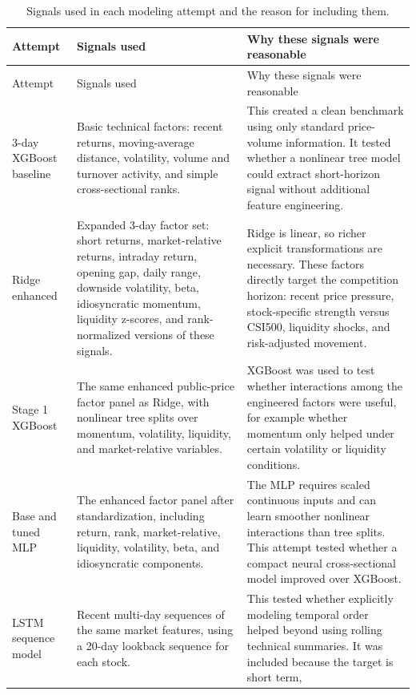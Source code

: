 \documentclass[11pt]{article}
\begin{document}
{\small
\setlength{\tabcolsep}{4pt}
\begin{longtable}{p{}p{}p{}}
\caption{Signals used in each modeling attempt and the reason for including them.}
\label{tab:factor-by-attempt}\\
\toprule
Attempt & Signals used & Why these signals were reasonable \\
\midrule
\endfirsthead
\toprule
Attempt & Signals used & Why these signals were reasonable \\
\midrule
\endhead
3-day XGBoost baseline &
Basic technical factors: recent returns, moving-average distance, volatility,
volume and turnover activity, and simple cross-sectional ranks. &
This created a clean benchmark using only standard price-volume information.
It tested whether a nonlinear tree model could extract short-horizon signal
without additional feature engineering. \\
\midrule
Ridge enhanced &
Expanded 3-day factor set: short returns, market-relative returns, intraday
return, opening gap, daily range, downside volatility, beta, idiosyncratic
momentum, liquidity z-scores, and rank-normalized versions of these signals. &
Ridge is linear, so richer explicit transformations are necessary. These
factors directly target the competition horizon: recent price pressure,
stock-specific strength versus CSI500, liquidity shocks, and risk-adjusted
movement. \\
\midrule
Stage 1 XGBoost &
The same enhanced public-price factor panel as Ridge, with nonlinear tree
splits over momentum, volatility, liquidity, and market-relative variables. &
XGBoost was used to test whether interactions among the engineered factors
were useful, for example whether momentum only helped under certain volatility
or liquidity conditions. \\
\midrule
Base and tuned MLP &
The enhanced factor panel after standardization, including return, rank,
market-relative, liquidity, volatility, beta, and idiosyncratic components. &
The MLP requires scaled continuous inputs and can learn smoother nonlinear
interactions than tree splits. This attempt tested whether a compact neural
cross-sectional model improved over XGBoost. \\
\midrule
LSTM sequence model &
Recent multi-day sequences of the same market features, using a 20-day lookback
sequence for each stock. &
This tested whether explicitly modeling temporal order helped beyond using
rolling technical summaries. It was included because the target is short term,

\end{longtable}}
\end{document}
